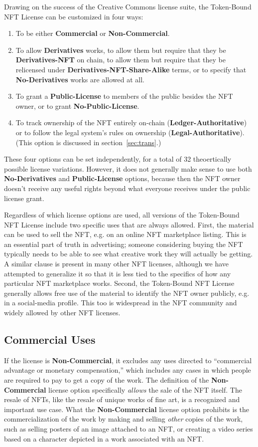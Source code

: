 \documentclass{article}
\newcommand{\iccclicense}{Token-Bound NFT License\xspace}
\newcommand{\keyword}[1]{\textbf{#1}\xspace}
\newcommand{\publiclicense}{\keyword{Public-License}}
\newcommand{\nopubliclicense}{\keyword{No-Public-License}}
\newcommand{\commercial}{\keyword{Commercial}}
\newcommand{\noncommercial}{\keyword{Non-Commercial}}
\newcommand{\noderivative}{\keyword{No-Derivatives}}
\newcommand{\derivative}{\keyword{Derivatives}}
\newcommand{\derivativetracking}{\keyword{Derivatives-NFT}}
\newcommand{\sharealike}{\keyword{Derivatives-NFT-Share-Alike}}
\newcommand{\ledger}{\keyword{Ledger-Authoritative}}
\newcommand{\legal}{\keyword{Legal-Authoritative}}
\begin{document}
Drawing on the success of the Creative Commons license suite, the \iccclicense can be customized in four ways: 
\begin{enumerate}
\item To be either \commercial or \noncommercial.
\item To allow \derivative works, to allow them but require that they be \derivativetracking on chain, to allow them but require that they be relicensed under \sharealike terms, or to specify that \noderivative works are allowed at all. 
\item To grant a \publiclicense to members of the public besides the NFT owner, or to grant \nopubliclicense.
\item To track ownership of the NFT entirely on-chain (\ledger) or to follow the legal system's rules on ownership (\legal). (This option is discussed in section~\ref{sec:trans}.)
\end{enumerate} 
These four options can be set independently, for a total of 32 theoertically possible license variations. However, it does not generally make sense to use both \noderivative and \publiclicense options, because then the NFT owner doesn't receive any useful rights beyond what everyone receives under the public license grant.

Regardless of which license options are used, all versions of the \iccclicense include two specific uses that are always allowed. First, the material can be used to sell the NFT, e.g. on an online NFT marketplace listing. This is an essential part of truth in advertising; someone considering buying the NFT typically needs to be able to see what creative work they will actually be getting. A similar clause is present in many other NFT licenses, although we have attempted to generalize it so that it is less tied to the specifics of how any particular NFT marketplace works. Second, the \iccclicense generally allows free use of the material to identify the NFT owner publicly, e.g. in a social-media profile. This too is widespread in the NFT community and widely allowed by other NFT licenses.


\subsection{Commercial Uses}

If the license is \noncommercial, it excludes any uses directed to ``commercial advantage or monetary compensation,'' which includes any cases in which people are required to pay to get a copy of the work.  The definition of the \noncommercial license option specifically \emph{allows} the sale of the NFT itself. The resale of NFTs, like the resale of unique works of fine art, is a recognized and important use case. What the \noncommercial license option prohibits is the commercialization of the work by making and selling \emph{other} copies of the work, such as selling posters of an image attached to an NFT, or creating a video series based on a character depicted in a work associated with an NFT.
\end{document}
